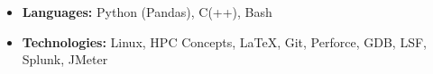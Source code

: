 \documentclass[11pt,letterpaper,sans]{moderncv}
\begin{document}

\begin{itemize}
\item[]  \textbf{Languages:} Python (Pandas), C(++), Bash
\vspace{3pt}
\item[]  \textbf{Technologies:} Linux, HPC Concepts, LaTeX, Git, Perforce, GDB, LSF, Splunk, JMeter

\end{itemize}


%
%


\end{document}

